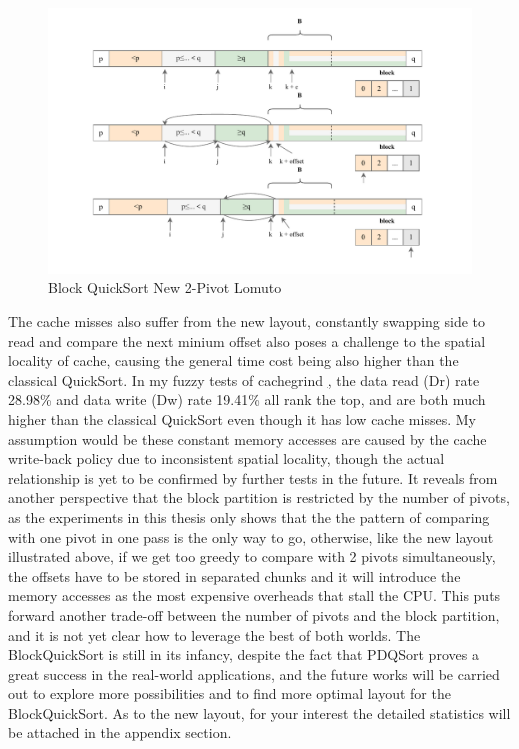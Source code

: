 \documentclass{article}
\begin{document}
\begin{figure}[H]
    \hypertarget{fig:newblock}{}
    \caption{Block QuickSort New 2-Pivot Lomuto}
    \centering
    \hspace*{-0.27\textwidth}
    \includegraphics[width=1.5\textwidth]{new_lomuto_block.drawio.pdf}
\end{figure}
The cache misses also suffer from the new layout, constantly swapping side to read and compare the next minium offset also poses a challenge to the spatial locality of cache,
causing the general time cost being also higher than the classical QuickSort. In my fuzzy tests of cachegrind \hyperlink{cachegrindresult}, the data read (Dr) rate 28.98\% and data write (Dw) rate 19.41\% all rank the top, and are both much higher than the classical QuickSort even though it has low cache misses.
My assumption would be these constant memory accesses are caused by the cache write-back policy due to inconsistent spatial locality, though the actual relationship is yet to be confirmed by further tests in the future.
It reveals from another perspective that the block partition is restricted by the number of pivots, as the experiments in this thesis only shows that the the pattern of comparing with one pivot in one pass is the only way to go, otherwise, like the new layout illustrated above, if we get too greedy to compare with 2 pivots simultaneously,
the offsets have to be stored in separated chunks and it will introduce the memory accesses as the most expensive overheads that stall the CPU. This puts forward another trade-off between the number of pivots and the block partition, and it is not yet clear how to leverage the best of both worlds.
The BlockQuickSort is still in its infancy, despite the fact that PDQSort proves a great success in the real-world applications, and the future works will be carried out to explore more possibilities and to find more optimal layout for the BlockQuickSort.
As to the new layout, for your interest the detailed statistics will be attached in the appendix section.
\end{document}
